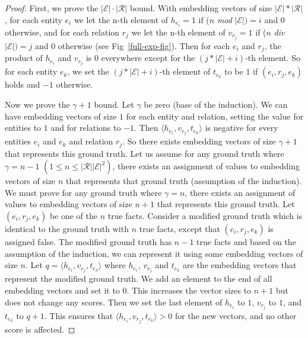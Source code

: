 \documentclass{article}
\newcommand{\entities}{\ensuremath{\mathcal{E}}}
\newcommand{\relations}{\ensuremath{\mathcal{R}}}
\newcommand{\triple}[3]{(\mathit{#1}, \mathit{#2}, \mathit{#3})}
\begin{document}
\begin{proof}
First, we prove the $|\entities|\cdot |\relations|$ bound. With embedding vectors of size $|\entities|*|\relations|$, for each entity $e_i$ we let the n-th element of $h_{e_i} = 1$ if ($n$ \emph{mod} $|\entities|)=i$ and $0$ otherwise, and for each relation $r_j$ we let the n-th element of $v_{r_j}=1$ if ($n$ \emph{div} $|\entities|)=j$ and $0$ otherwise (see Fig~\ref{full-exp-fig}). Then for each $e_i$ and $r_j$, the product of $h_{e_i}$ and $v_{r_j}$ is $0$ everywhere except for the $(j*|\entities|+i)$-th element. So for each entity $e_k$, we set the $(j*|\entities|+i)$-th element of $t_{e_k}$ to be $1$ if $\triple{e_i}{r_j}{e_k}$ holds and $-1$ otherwise.

Now we prove the $\gamma+1$ bound. Let $\gamma$ be zero (base of the induction). We can have embedding vectors of size $1$ for each entity and relation, setting the value for entities to $1$ and for relations to $-1$. Then $\langle h_{e_i}, v_{r_j}, t_{e_k} \rangle$ is negative for every entities $e_i$ and $e_k$ and relation $r_j$. So there exists embedding vectors of size $\gamma+1$ that represents this ground truth.
Let us assume for any ground truth where $\gamma=n-1$ $(1 \leq n \leq |\relations||\entities|^2)$, there exists an assignment of values to embedding vectors of size $n$ that represents that ground truth (assumption of the induction). We must prove for any ground truth where $\gamma=n$, there exists an assignment of values to embedding vectors of size $n+1$ that represents this ground truth.
Let $\triple{e_i}{r_j}{e_k}$ be one of the $n$ true facts. Consider a modified ground truth which is identical to the ground truth with $n$ true facts, except that $\triple{e_i}{r_j}{e_k}$ is assigned false. The modified ground truth has $n-1$ true facts and based on the assumption of the induction, we can represent it using some embedding vectors of size $n$. Let $q=\langle h_{e_i}, v_{r_j}, t_{e_k} \rangle$ where $h_{e_i}$, $v_{r_j}$ and $t_{e_k}$ are the embedding vectors that represent the modified ground truth. We add an element to the end of all embedding vectors and set it to $0$. This increases the vector sizes to $n+1$ but does not change any scores. Then we set the last element of $h_{e_i}$ to $1$, $v_{r_j}$ to $1$, and $t_{e_k}$ to $q+1$. This ensures that $\langle h_{e_i}, v_{r_j}, t_{e_k} \rangle > 0$ for the new vectors, and no other score is affected.
\end{proof}
\end{document}
